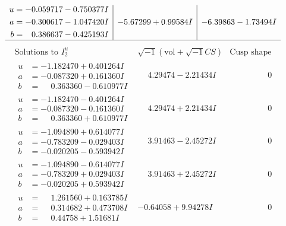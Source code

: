 \documentclass[1p]{elsarticle_modified}
\theoremstyle{definition}
\newcommand{\I}{\sqrt{-1}}
\begin{document}
$$\begin{array}{c|c|c}
\begin{aligned}
u &= -0.059717 - 0.750377 I \\
a &= -0.300617 - 1.047420 I \\
b &= \phantom{-}0.386637 - 0.425193 I\end{aligned}
 & -5.67299 + 0.99584 I & -6.39863 - 1.73494 I\\
 \hline 
 \end{array}$$\newpage$$\begin{array}{c|c|c}  
\text{Solutions to }I^u_{2}& \I (\text{vol} + \sqrt{-1}CS) & \text{Cusp shape}\\
 \hline 
\begin{aligned}
u &= -1.182470 + 0.401264 I \\
a &= -0.087320 + 0.161360 I \\
b &= \phantom{-}0.363360 - 0.610977 I\end{aligned}
 & \phantom{-}4.29474 - 2.21434 I & \phantom{-0.000000 } 0 \\ \hline\begin{aligned}
u &= -1.182470 - 0.401264 I \\
a &= -0.087320 - 0.161360 I \\
b &= \phantom{-}0.363360 + 0.610977 I\end{aligned}
 & \phantom{-}4.29474 + 2.21434 I & \phantom{-0.000000 } 0 \\ \hline\begin{aligned}
u &= -1.094890 + 0.614077 I \\
a &= -0.783209 - 0.029403 I \\
b &= -0.020205 - 0.593942 I\end{aligned}
 & \phantom{-}3.91463 - 2.45272 I & \phantom{-0.000000 } 0 \\ \hline\begin{aligned}
u &= -1.094890 - 0.614077 I \\
a &= -0.783209 + 0.029403 I \\
b &= -0.020205 + 0.593942 I\end{aligned}
 & \phantom{-}3.91463 + 2.45272 I & \phantom{-0.000000 } 0 \\ \hline\begin{aligned}
u &= \phantom{-}1.261560 + 0.163785 I \\
a &= \phantom{-}0.314682 + 0.473708 I \\
b &= \phantom{-}0.44758 + 1.51681 I\end{aligned}
 & -0.64058 + 9.94278 I & \phantom{-0.000000 } 0 \\ \hline\begin{aligned}

\end{aligned}
\end{array}$$
\end{document}
